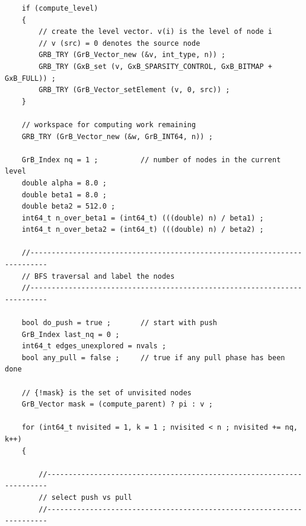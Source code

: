 \begin{verbatim}
    if (compute_level)
    {
        // create the level vector. v(i) is the level of node i
        // v (src) = 0 denotes the source node
        GRB_TRY (GrB_Vector_new (&v, int_type, n)) ;
        GRB_TRY (GxB_set (v, GxB_SPARSITY_CONTROL, GxB_BITMAP + GxB_FULL)) ;
        GRB_TRY (GrB_Vector_setElement (v, 0, src)) ;
    }

    // workspace for computing work remaining
    GRB_TRY (GrB_Vector_new (&w, GrB_INT64, n)) ;

    GrB_Index nq = 1 ;          // number of nodes in the current level
    double alpha = 8.0 ;
    double beta1 = 8.0 ;
    double beta2 = 512.0 ;
    int64_t n_over_beta1 = (int64_t) (((double) n) / beta1) ;
    int64_t n_over_beta2 = (int64_t) (((double) n) / beta2) ;

    //--------------------------------------------------------------------------
    // BFS traversal and label the nodes
    //--------------------------------------------------------------------------

    bool do_push = true ;       // start with push
    GrB_Index last_nq = 0 ;
    int64_t edges_unexplored = nvals ;
    bool any_pull = false ;     // true if any pull phase has been done

    // {!mask} is the set of unvisited nodes
    GrB_Vector mask = (compute_parent) ? pi : v ;

    for (int64_t nvisited = 1, k = 1 ; nvisited < n ; nvisited += nq, k++)
    {

        //----------------------------------------------------------------------
        // select push vs pull
        //----------------------------------------------------------------------


\end{verbatim}
